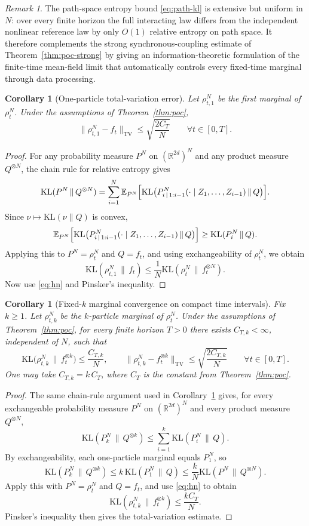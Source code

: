 \documentclass[11pt]{article}
\newtheorem{corollary}[theorem]{Corollary}
\theoremstyle{definition}
\theoremstyle{remark}
\newtheorem{remark}[theorem]{Remark}
\newcommand{\R}{\mathbb{R}}
\newcommand{\E}{\mathbb{E}}
\newcommand{\KL}{\mathrm{KL}}
\newcommand{\TV}{\mathrm{TV}}
\begin{document}
\begin{remark}
The path-space entropy bound \eqref{eq:path-kl} is extensive but uniform in
$N$: over every finite horizon the full interacting law differs from the
independent nonlinear reference law by only $O(1)$ relative entropy on path
space. It therefore complements the strong synchronous-coupling estimate of
Theorem~\ref{thm:poc-strong} by giving an information-theoretic formulation of
the finite-time mean-field limit that automatically controls every fixed-time
marginal through data processing.
\end{remark}

\begin{corollary}[One-particle total-variation error]\label{cor:poc-tv}
Let $\rho_{t,1}^N$ be the first marginal of $\rho_t^N$. Under the assumptions
of Theorem~\ref{thm:poc},
\[
\|\rho_{t,1}^N-f_t\|_{\TV}
\leq
\sqrt{\frac{2C_T}{N}}
\qquad
\forall t\in[0,T].
\]
\end{corollary}

\begin{proof}
For any probability measure $P^N$ on $(\R^{2d})^N$ and any product measure
$Q^{\otimes N}$, the chain rule for relative entropy gives
\[
\KL(P^N\,\|\,Q^{\otimes N})
=
\sum_{i=1}^N
\E_{P^N}\Bigl[
\KL\bigl(P_{i\,|\,1:i-1}^N(\cdot\mid Z_1,\dots,Z_{i-1})\,\|\,Q\bigr)
\Bigr].
\]
Since $\nu\mapsto \KL(\nu\|Q)$ is convex,
\[
\E_{P^N}\Bigl[
\KL\bigl(P_{i\,|\,1:i-1}^N(\cdot\mid Z_1,\dots,Z_{i-1})\,\|\,Q\bigr)
\Bigr]
\geq
\KL(P_i^N\,\|\,Q).
\]
Applying this to $P^N=\rho_t^N$ and $Q=f_t$, and using exchangeability of
$\rho_t^N$, we obtain
\[
\KL(\rho_{t,1}^N\,\|\,f_t)
\leq
\frac{1}{N}\KL(\rho_t^N\,\|\,f_t^{\otimes N}).
\]
Now use \eqref{eq:hn} and Pinsker's inequality.
\end{proof}

\begin{corollary}[Fixed-\(k\) marginal convergence on compact time intervals]\label{cor:poc-k}
Fix \(k\ge1\). Let \(\rho_{t,k}^N\) be the \(k\)-particle marginal of
\(\rho_t^N\). Under the assumptions of Theorem~\ref{thm:poc}, for every finite
horizon \(T>0\) there exists \(C_{T,k}<\infty\), independent of \(N\), such
that
\[
\KL\bigl(\rho_{t,k}^N\,\|\,f_t^{\otimes k}\bigr)\le \frac{C_{T,k}}{N},
\qquad
\|\rho_{t,k}^N-f_t^{\otimes k}\|_{\TV}\le \sqrt{\frac{2C_{T,k}}{N}}
\qquad
\forall t\in[0,T].
\]
One may take \(C_{T,k}=k\,C_T\), where \(C_T\) is the constant from
Theorem~\ref{thm:poc}.
\end{corollary}

\begin{proof}
The same chain-rule argument used in Corollary~\ref{cor:poc-tv} gives, for
every exchangeable probability measure \(P^N\) on \((\R^{2d})^N\) and every
product measure \(Q^{\otimes N}\),
\[
\KL(P_k^N\,\|\,Q^{\otimes k})
\le
\sum_{i=1}^k \KL(P_i^N\,\|\,Q).
\]
By exchangeability, each one-particle marginal equals \(P_1^N\), so
\[
\KL(P_k^N\,\|\,Q^{\otimes k})
\le
k\,\KL(P_1^N\,\|\,Q)
\le
\frac{k}{N}\KL(P^N\,\|\,Q^{\otimes N}).
\]
Apply this with \(P^N=\rho_t^N\) and \(Q=f_t\), and use \eqref{eq:hn} to obtain
\[
\KL(\rho_{t,k}^N\,\|\,f_t^{\otimes k})\le \frac{kC_T}{N}.
\]
Pinsker's inequality then gives the total-variation estimate.
\end{proof}
\end{document}
